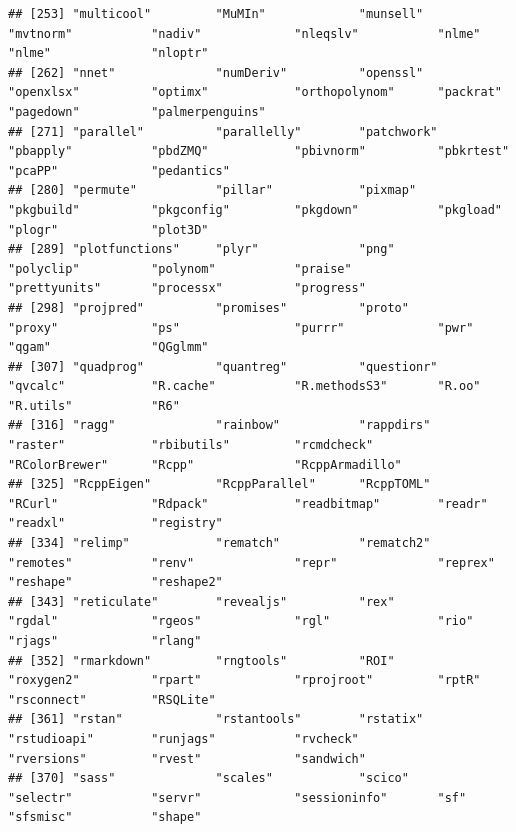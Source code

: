 \documentclass[
  12pt,
]{book}
\begin{document}
\begin{verbatim}
## [253] "multicool"         "MuMIn"             "munsell"           "mvtnorm"           "nadiv"             "nleqslv"           "nlme"              "nlme"              "nloptr"           
## [262] "nnet"              "numDeriv"          "openssl"           "openxlsx"          "optimx"            "orthopolynom"      "packrat"           "pagedown"          "palmerpenguins"   
## [271] "parallel"          "parallelly"        "patchwork"         "pbapply"           "pbdZMQ"            "pbivnorm"          "pbkrtest"          "pcaPP"             "pedantics"        
## [280] "permute"           "pillar"            "pixmap"            "pkgbuild"          "pkgconfig"         "pkgdown"           "pkgload"           "plogr"             "plot3D"           
## [289] "plotfunctions"     "plyr"              "png"               "polyclip"          "polynom"           "praise"            "prettyunits"       "processx"          "progress"         
## [298] "projpred"          "promises"          "proto"             "proxy"             "ps"                "purrr"             "pwr"               "qgam"              "QGglmm"           
## [307] "quadprog"          "quantreg"          "questionr"         "qvcalc"            "R.cache"           "R.methodsS3"       "R.oo"              "R.utils"           "R6"               
## [316] "ragg"              "rainbow"           "rappdirs"          "raster"            "rbibutils"         "rcmdcheck"         "RColorBrewer"      "Rcpp"              "RcppArmadillo"    
## [325] "RcppEigen"         "RcppParallel"      "RcppTOML"          "RCurl"             "Rdpack"            "readbitmap"        "readr"             "readxl"            "registry"         
## [334] "relimp"            "rematch"           "rematch2"          "remotes"           "renv"              "repr"              "reprex"            "reshape"           "reshape2"         
## [343] "reticulate"        "revealjs"          "rex"               "rgdal"             "rgeos"             "rgl"               "rio"               "rjags"             "rlang"            
## [352] "rmarkdown"         "rngtools"          "ROI"               "roxygen2"          "rpart"             "rprojroot"         "rptR"              "rsconnect"         "RSQLite"          
## [361] "rstan"             "rstantools"        "rstatix"           "rstudioapi"        "runjags"           "rvcheck"           "rversions"         "rvest"             "sandwich"         
## [370] "sass"              "scales"            "scico"             "selectr"           "servr"             "sessioninfo"       "sf"                "sfsmisc"           "shape"            

\end{verbatim}
\end{document}

